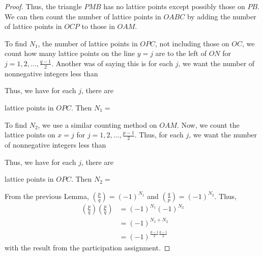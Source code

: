 \documentclass{ximera}
\begin{document}
\begin{proof}
Thus, the triangle $PMB$ has no lattice points except possibly those on $PB$. We can then count the number of lattice points in $OABC$ by adding the number of lattice points in $OCP$ to those in $OAM$.

To find $N_1$, the number of lattice points in $OPC$, not including those on $OC$, we count how many lattice points on the line $y=j$ are to the left of $ON$ for $j=1,2,\dots,\frac{q-1}{2}$. Another was of saying this is for each $j$, we want the number of nonnegative integers less than \begin{multipleChoice}
\end{multipleChoice} 

Thus, we have for each $j$, there are 
\begin{multipleChoice}
\end{multipleChoice}
 
lattice points in $OPC$. Then $N_1=$
 \begin{multipleChoice}
\end{multipleChoice}

To find $N_2$, we use a similar counting method on $OAM$. Now, we count the lattice points on $x=j$ for $j=1,2,\dots,\frac{p-1}{2}$. Thus, for each $j$, we want the number of nonnegative integers less than  \begin{multipleChoice}
\end{multipleChoice} Thus, we have for each $j$, there are \begin{multipleChoice}
\end{multipleChoice}
lattice points in $OPC$. Then $N_2= $\begin{multipleChoice}
\end{multipleChoice}
From the previous Lemma, $\left(\frac{p}{q}\right)=(-1)^{N_1}$ and $\left(\frac{q}{p}\right)=(-1)^{N_2}$. Thus, 
\begin{align*}
 \left(\frac{p}{q}\right)\left(\frac{p}{q}\right)&=(-1)^{N_1} (-1)^{N_2} \\
 &=(-1)^{N_1+N_2}\\
&=(-1)^{\frac{p-1}{2}\frac{q-1}{2}}
\end{align*}
with the result from the participation assignment.
\end{proof}
\end{document}
